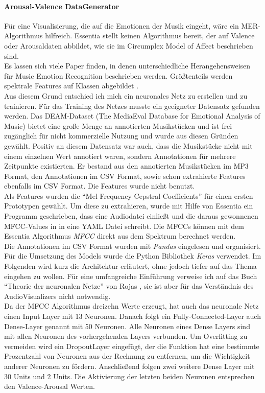 \documentclass[11pt,a4paper]{article}
\begin{document}
\paragraph{Arousal-Valence DataGenerator}
Für eine Visualisierung, die auf die Emotionen der Musik eingeht, wäre ein MER-Algorithmus hilfreich. Essentia stellt keinen Algorithmus bereit, der auf Valence oder Arousaldaten abbildet, wie sie im Circumplex Model of Affect beschrieben sind.\\
Es lassen sich viele Paper finden, in denen unterschiedliche Herangehensweisen für Music Emotion Recognition beschrieben werden. Größtenteils werden spektrale Features auf Klassen abgebildet \cite[S. 159]{lerch2012introduction}.\\
Aus diesem Grund entschied ich mich ein neuronales Netz zu erstellen und zu trainieren. Für das Training des Netzes musste ein geeigneter Datensatz gefunden werden. Das DEAM-Dataset (The MediaEval Database for Emotional Analysis of Music) bietet eine große Menge an annotierten Musikstücken und ist frei zugänglich für nicht kommerzielle Nutzung \cite{AlajankiEmoInMusicAnalysis} und wurde aus diesen Gründen gewählt. Positiv an diesem Datensatz war auch, dass die Musikstücke nicht mit einem einzelnen Wert annotiert waren, sondern Annotationen für mehrere Zeitpunkte existierten. Er bestand aus den annotierten Musikstücken im MP3 Format, den Annotationen im CSV Format, sowie schon extrahierte Features ebenfalls im CSV Format. Die Features wurde nicht benutzt.\\
Als Features wurden die ``Mel Frequency Cepstral Coefficients'' für einen ersten Prototypen gewählt. Um diese zu extrahieren, wurde mit Hilfe von Essentia ein Programm geschrieben, dass eine Audiodatei einließt und die daraus gewonnenen MFCC-Values in in eine YAML Datei schreibt. Die MFCCs können mit dem Essentia Algorithmus \textit{MFCC} direkt aus dem Spektrum berechnet werden.\\
Die Annotationen im CSV Format wurden mit \textit{Pandas} eingelesen und organisiert. Für die Umsetzung des Models wurde die Python Bibliothek \textit{Keras} verwendet. Im Folgenden wird kurz die Architektur erläutert, ohne jedoch tiefer auf das Thema eingehen zu wollen. Für eine umfangreiche Einführung verweise ich auf das Buch ``Theorie der neuronalen Netze'' von Rojas \cite{rojas2013theorie}, sie ist aber für das Verständnis des AudioVisualizers nicht notwendig.\\
Da der MFCC Algorithmus dreizehn Werte erzeugt, hat auch das neuronale Netz einen Input Layer mit 13 Neuronen. Danach folgt ein Fully-Connected-Layer auch Dense-Layer genannt mit 50 Neuronen. Alle Neuronen eines Dense Layers sind mit allen Neuronen des vorhergehenden Layers verbunden. Um Overfitting zu vermeiden wird ein DropoutLayer eingefügt, der die Funktion hat eine bestimmte Prozentzahl von Neuronen aus der Rechnung zu entfernen, um die Wichtigkeit anderer Neuronen zu fördern. Anschließend folgen zwei weitere Dense Layer mit 30 Units und 2 Units. Die Aktivierung der letzten beiden Neuronen entsprechen den Valence-Arousal Werten.
\end{document}
